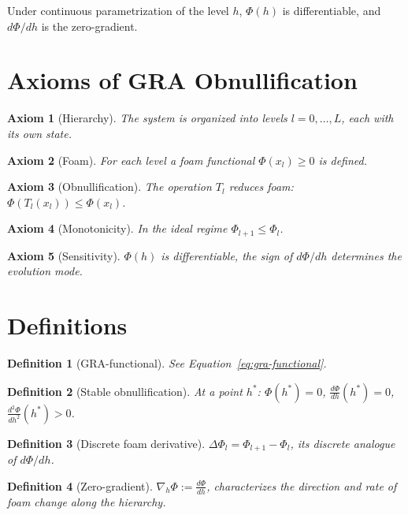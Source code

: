 \documentclass[11pt,a4paper]{article}
\newtheorem{axiom}{Axiom}
\newtheorem{definition}{Definition}
\begin{document}
Under continuous parametrization of the level $h$, $\Phi(h)$ is differentiable, and $d\Phi/dh$ is the zero-gradient.

\section{Axioms of GRA Obnullification}

\begin{axiom}[Hierarchy]
The system is organized into levels $l = 0,\dots,L$, each with its own state.
\end{axiom}

\begin{axiom}[Foam]
For each level a foam functional $\Phi(x_l) \geq 0$ is defined.
\end{axiom}

\begin{axiom}[Obnullification]
The operation $T_l$ reduces foam: $\Phi(T_l(x_l)) \leq \Phi(x_l)$.
\end{axiom}

\begin{axiom}[Monotonicity]
In the ideal regime $\Phi_{l+1} \leq \Phi_l$.
\end{axiom}

\begin{axiom}[Sensitivity]
$\Phi(h)$ is differentiable, the sign of $d\Phi/dh$ determines the evolution mode.
\end{axiom}

\section{Definitions}

\begin{definition}[GRA-functional]
See Equation~\ref{eq:gra-functional}.
\end{definition}

\begin{definition}[Stable obnullification]
At a point $h^*$: $\Phi(h^*) = 0$, $\frac{d\Phi}{dh}(h^*) = 0$, $\frac{d^2\Phi}{dh^2}(h^*) > 0$.
\end{definition}

\begin{definition}[Discrete foam derivative]
$\Delta\Phi_l = \Phi_{l+1} - \Phi_l$, its discrete analogue of $d\Phi/dh$.
\end{definition}

\begin{definition}[Zero-gradient]
$\nabla_h \Phi := \frac{d\Phi}{dh}$, characterizes the direction and rate of foam change along the hierarchy.
\end{definition}
\end{document}
